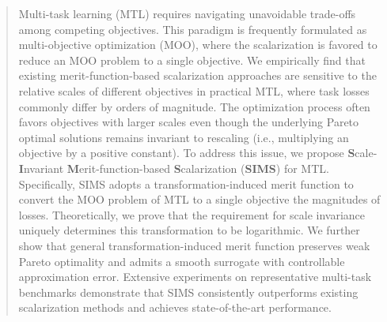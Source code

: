 \documentclass[sigconf]{acmart}
\begin{document}
\begin{abstract}
Multi-task learning (MTL) requires navigating unavoidable trade-offs among competing objectives.
This paradigm is frequently formulated as multi-objective optimization (MOO), where the scalarization is favored to reduce an MOO problem to a single objective.
We empirically find that existing merit-function-based scalarization approaches are sensitive to the relative scales of different objectives in practical MTL, where task losses commonly differ by orders of magnitude. 
The optimization process often favors objectives with larger scales even though the underlying Pareto  optimal solutions remains invariant to rescaling (i.e., multiplying an objective by a positive constant).
To address this issue, we propose \textbf{S}cale-\textbf{I}nvariant \textbf{M}erit-function-based \textbf{S}calarization (\textbf{SIMS}) for MTL. Specifically, SIMS adopts a transformation-induced merit function to convert the MOO problem of MTL to a single objective  the magnitudes of losses.
Theoretically, we prove that the requirement for scale invariance uniquely determines this transformation to be logarithmic. We further show that  general transformation-induced merit function preserves weak Pareto optimality and admits a smooth surrogate with controllable approximation error.
Extensive experiments on representative multi-task benchmarks demonstrate that SIMS consistently outperforms existing scalarization methods and achieves state-of-the-art performance.
\end{abstract}
\end{document}
